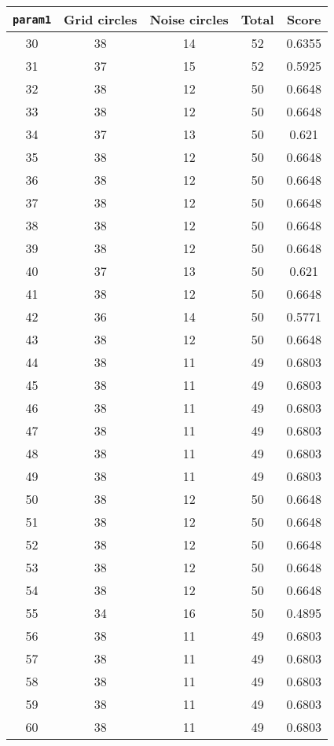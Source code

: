 \documentclass[letterpaper, 12pt]{article}
\begin{document}
\begin{longtable}{|c|c|c|c|c|}
\hline
\textbf{\texttt{param1}} & \textbf{Grid circles} & \textbf{Noise circles} & \textbf{Total} & \textbf{Score} \\
\hline
30 & 38 & 14 & 52 & 0.6355 \\
\hline
31 & 37 & 15 & 52 & 0.5925 \\
\hline
32 & 38 & 12 & 50 & 0.6648 \\
\hline
33 & 38 & 12 & 50 & 0.6648 \\
\hline
34 & 37 & 13 & 50 & 0.621 \\
\hline
35 & 38 & 12 & 50 & 0.6648 \\
\hline
36 & 38 & 12 & 50 & 0.6648 \\
\hline
37 & 38 & 12 & 50 & 0.6648 \\
\hline
38 & 38 & 12 & 50 & 0.6648 \\
\hline
39 & 38 & 12 & 50 & 0.6648 \\
\hline
40 & 37 & 13 & 50 & 0.621 \\
\hline
41 & 38 & 12 & 50 & 0.6648 \\
\hline
42 & 36 & 14 & 50 & 0.5771 \\
\hline
43 & 38 & 12 & 50 & 0.6648 \\
\hline
44 & 38 & 11 & 49 & 0.6803 \\
\hline
45 & 38 & 11 & 49 & 0.6803 \\
\hline
46 & 38 & 11 & 49 & 0.6803 \\
\hline
47 & 38 & 11 & 49 & 0.6803 \\
\hline
48 & 38 & 11 & 49 & 0.6803 \\
\hline
49 & 38 & 11 & 49 & 0.6803 \\
\hline
50 & 38 & 12 & 50 & 0.6648 \\
\hline
51 & 38 & 12 & 50 & 0.6648 \\
\hline
52 & 38 & 12 & 50 & 0.6648 \\
\hline
53 & 38 & 12 & 50 & 0.6648 \\
\hline
54 & 38 & 12 & 50 & 0.6648 \\
\hline
55 & 34 & 16 & 50 & 0.4895 \\
\hline
56 & 38 & 11 & 49 & 0.6803 \\
\hline
57 & 38 & 11 & 49 & 0.6803 \\
\hline
58 & 38 & 11 & 49 & 0.6803 \\
\hline
59 & 38 & 11 & 49 & 0.6803 \\
\hline
60 & 38 & 11 & 49 & 0.6803 \\

\end{longtable}
\end{document}
